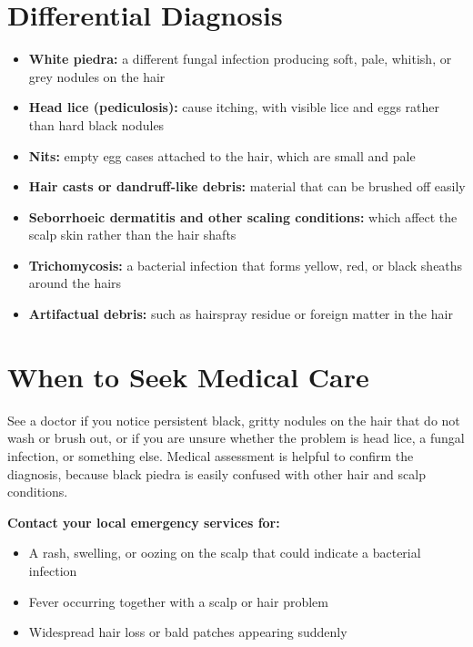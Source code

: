 \section*{Differential Diagnosis}
\begin{itemize}
    \item \textbf{White piedra:} a different fungal infection producing soft, pale, whitish, or grey nodules on the hair
    \item \textbf{Head lice (pediculosis):} cause itching, with visible lice and eggs rather than hard black nodules
    \item \textbf{Nits:} empty egg cases attached to the hair, which are small and pale
    \item \textbf{Hair casts or dandruff-like debris:} material that can be brushed off easily
    \item \textbf{Seborrhoeic dermatitis and other scaling conditions:} which affect the scalp skin rather than the hair shafts
    \item \textbf{Trichomycosis:} a bacterial infection that forms yellow, red, or black sheaths around the hairs
    \item \textbf{Artifactual debris:} such as hairspray residue or foreign matter in the hair
\end{itemize}

\section*{When to Seek Medical Care}
See a doctor if you notice persistent black, gritty nodules on the hair that do not wash or brush out, or if you are unsure whether the problem is head lice, a fungal infection, or something else. Medical assessment is helpful to confirm the diagnosis, because black piedra is easily confused with other hair and scalp conditions.

\textbf{Contact your local emergency services for:}
\begin{itemize}
    \item A rash, swelling, or oozing on the scalp that could indicate a bacterial infection
    \item Fever occurring together with a scalp or hair problem
    \item Widespread hair loss or bald patches appearing suddenly
\end{itemize}

